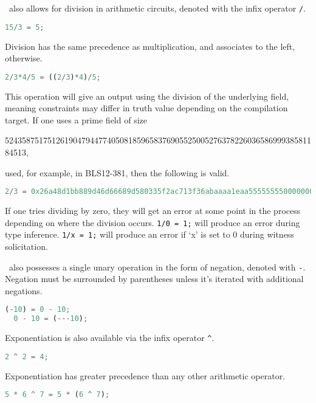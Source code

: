 \vampir\ also allows for division in arithmetic circuits, denoted with the infix operator \lstinline{/}.

\begin{lstlisting}[language=Python]
  15/3 = 5;
\end{lstlisting}

Division has the same precedence as multiplication, and associates to the left, otherwise. 

\begin{lstlisting}[language=Python]
  2/3*4/5 = ((2/3)*4)/5;
\end{lstlisting}

This operation will give an output using the division of the underlying field, meaning constraints may differ in truth value depending on the compilation target. If one uses a prime field of size

52435875175126190479447740508185965837690552500527637822603658699938581184513,

used, for example, in BLS12-381, then the following is valid.

\begin{lstlisting}[language=Python]
2/3 = 0x26a48d1bb889d46d66689d580335f2ac713f36abaaaa1eaa5555555500000001;
\end{lstlisting}
  
If one tries dividing by zero, they will get an error at some point in the process depending on where the division occurs. \lstinline{1/0 = 1;} will produce an error during type inference. \lstinline{1/x = 1;} will produce an error if `x' is set to 0 during witness solicitation.

\vampir\ also possesses a single unary operation in the form of negation, denoted with \lstinline{-}. Negation must be surrounded by parentheses unless it's iterated with additional negations.

\begin{lstlisting}[language=Python]
  (-10) = 0 - 10;
  0 - 10 = (---10);
\end{lstlisting}

Exponentiation is also available via the infix operator \lstinline{^}.

\begin{lstlisting}[language=Python]
  2 ^ 2 = 4;
\end{lstlisting}

Exponentiation has greater precedence than any other arithmetic operator. 

\begin{lstlisting}[language=Python]
  5 * 6 ^ 7 = 5 * (6 ^ 7);
\end{lstlisting}

